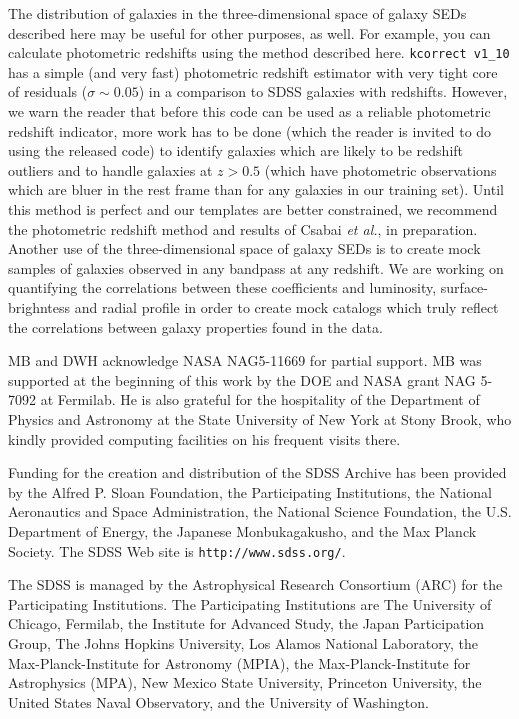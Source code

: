 \documentclass[10pt,preprint]{aastex}
\newcommand{\kversion}{{\tt v1\_10}}
\begin{document}
The distribution of galaxies in the three-dimensional space of galaxy
SEDs described here may be useful for other purposes, as well. For
example, you can calculate photometric redshifts using the method
described here. {\tt kcorrect \kversion} has a simple (and very fast)
photometric redshift estimator with very tight core of residuals
($\sigma \sim 0.05$) in a comparison to SDSS galaxies with redshifts.
However, we warn the reader that before this code can be used as a
reliable photometric redshift indicator, more work has to be done
(which the reader is invited to do using the released code) to
identify galaxies which are likely to be redshift outliers and to
handle galaxies at $z>0.5$ (which have photometric observations which
are bluer in the rest frame than for any galaxies in our training
set). Until this method is perfect and our templates are better
constrained, we recommend the photometric redshift method and results
of Csabai {\it et al.}, in preparation. Another use of the
three-dimensional space of galaxy SEDs is to create mock samples of
galaxies observed in any bandpass at any redshift. We are working on
quantifying the correlations between these coefficients and
luminosity, surface-brighntess and radial profile in order to create
mock catalogs which truly reflect the correlations between galaxy
properties found in the data.

\acknowledgments

MB and DWH acknowledge NASA NAG5-11669 for partial support.  MB was
supported at the beginning of this work by the DOE and NASA grant NAG
5-7092 at Fermilab. He is also grateful for the hospitality of the
Department of Physics and Astronomy at the State University of New
York at Stony Brook, who kindly provided computing facilities on his
frequent visits there.

Funding for the creation and distribution of the SDSS Archive has been
provided by the Alfred P. Sloan Foundation, the Participating
Institutions, the National Aeronautics and Space Administration, the
National Science Foundation, the U.S. Department of Energy, the
Japanese Monbukagakusho, and the Max Planck Society. The SDSS Web site
is {\tt http://www.sdss.org/}.

The SDSS is managed by the Astrophysical Research Consortium (ARC) for
the Participating Institutions. The Participating Institutions are The
University of Chicago, Fermilab, the Institute for Advanced Study, the
Japan Participation Group, The Johns Hopkins University, Los Alamos
National Laboratory, the Max-Planck-Institute for Astronomy (MPIA),
the Max-Planck-Institute for Astrophysics (MPA), New Mexico State
University, Princeton University, the United States Naval Observatory,
and the University of Washington.
 
\begin{thebibliography}{DUM}

\end{thebibliography}

\newpage

%


\end{document}
